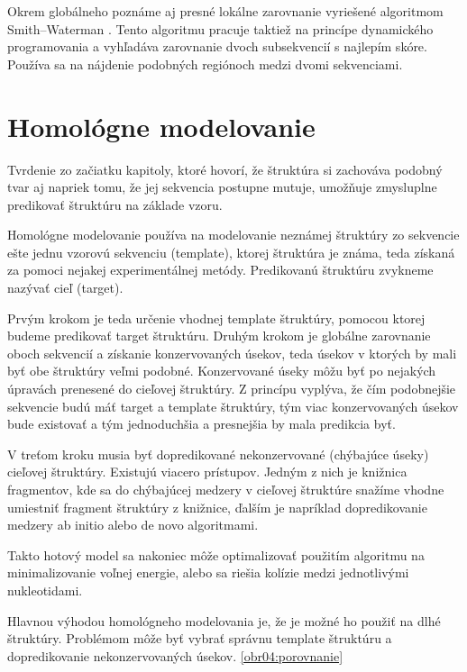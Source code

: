 \indent Okrem globálneho poznáme aj presné lokálne zarovnanie vyriešené algoritmom Smith–Waterman \cite{Smith81}. Tento algoritmu pracuje taktiež na princípe dynamického programovania a vyhľadáva zarovnanie dvoch subsekvencií s najlepím skóre. Používa sa na nájdenie podobných regiónoch medzi dvomi sekvenciami.


\section{Homológne modelovanie}
Tvrdenie zo začiatku kapitoly, ktoré hovorí, že štruktúra si zachováva podobný tvar aj napriek tomu, že jej sekvencia postupne mutuje, umožňuje zmysluplne predikovať štruktúru na základe vzoru.  


\indent Homológne  modelovanie používa na modelovanie neznámej štruktúry zo sekvencie ešte jednu vzorovú sekvenciu (template), ktorej štruktúra je známa, teda získaná za pomoci nejakej experimentálnej metódy. Predikovanú štruktúru zvykneme nazývať cieľ (target).


\indent Prvým krokom je teda určenie vhodnej template štruktúry, pomocou ktorej budeme predikovať target štruktúru. Druhým krokom je globálne zarovnanie oboch sekvencií a získanie konzervovaných úsekov, teda úsekov v ktorých by mali byť obe štruktúry veľmi podobné. Konzervované úseky môžu byť po nejakých úpravách prenesené do cieľovej štruktúry. Z princípu vyplýva, že čím podobnejšie sekvencie budú máť target a template štruktúry, tým viac konzervovaných úsekov bude existovať a tým jednoduchšia a presnejšia by mala predikcia byť.


\indent V treťom kroku musia byť dopredikované nekonzervované (chýbajúce úseky) cieľovej štruktúry. Existujú viacero prístupov. Jedným z nich je knižnica fragmentov, kde sa do chýbajúcej medzery v cieľovej štruktúre snažíme vhodne umiestniť fragment štruktúry z knižnice, ďalším je napríklad dopredikovanie medzery ab initio alebo de novo algoritmami.


\indent Takto hotový model sa nakoniec môže optimalizovať použitím algoritmu na minimalizovanie voľnej energie, alebo sa riešia kolízie medzi jednotlivými nukleotidami.


\indent Hlavnou výhodou homológneho modelovania je, že je možné ho použiť na dlhé štruktúry. Problémom môže byť vybrať správnu template štruktúru a dopredikovanie nekonzervovaných úsekov. \ref{obr04:porovnanie}



